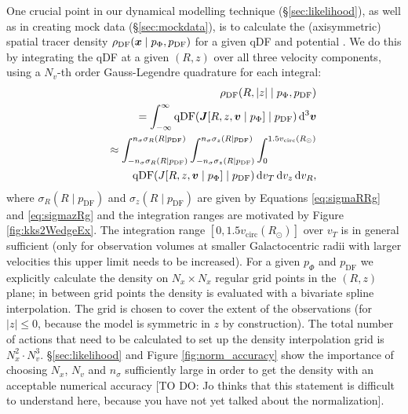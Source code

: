 One crucial point in our dynamical modelling technique (\S\ref{sec:likelihood}), as well as in creating mock data (\S\ref{sec:mockdata}), is to calculate the (axisymmetric) spatial tracer density $\rho_\text{DF}(\boldsymbol{x} \mid p_{\Phi},p_\text{DF})$ for a given qDF and potential . We do this by integrating the qDF at a given $(R,z)$ over all three velocity components, using a $N_v$-th order Gauss-Legendre quadrature for each integral:
\begin{eqnarray}
&&\rho_\text{DF}(R,|z| \mid p_{\Phi},p_\text{DF}) \nonumber\\
&&= \int_{-\infty}^{\infty} \text{qDF}(\boldsymbol{J}[R,z,\boldsymbol{v} \mid p_{\Phi}] \mid p_\text{DF}) \mathop{}\!\mathrm{d^3}\boldsymbol{v}  \label{eq:tracerdensity_general}\\
&&\approx \int_{-n_\sigma \sigma_R(R \mid p_\text{DF})}^{n_\sigma \sigma_R(R \mid p_\text{DF})} \int_{-n_\sigma\sigma_z(R \mid p_\text{DF})}^{n_\sigma \sigma_z(R \mid p_\text{DF})} \int_{0}^{1.5 v_\text{circ}(R_\odot)}  \nonumber\\
& & \hspace{1cm} \text{qDF}(J[R,z,\boldsymbol{v} \mid p_{\Phi}] \mid p_\text{DF}) \mathop{}\!\mathrm{d} v_T \mathop{}\!\mathrm{d} v_z \mathop{}\!\mathrm{d} v_R, \label{eq:tracerdensity}
\end{eqnarray}
where $\sigma_R(R \mid p_\text{DF})$ and $\sigma_z(R \mid p_\text{DF})$ are given by Equations \ref{eq:sigmaRRg} and \ref{eq:sigmazRg} and the integration ranges are motivated by Figure \ref{fig:kks2WedgeEx}. The integration range $[0,1.5 v_\text{circ}(R_\odot)]$ over $v_T$ is in general sufficient (only for observation volumes at smaller Galactocentric radii with larger velocities this upper limit needs to be increased). For a given $p_\Phi$ and $p_\text{DF}$ we explicitly calculate the density on $N_x \times N_x$ regular grid points in the $(R,z)$ plane; in between grid points the density is evaluated with a bivariate spline interpolation. The grid is chosen to cover the extent of the observations (for $|z|\leq0$, because the model is symmetric in $z$ by construction). The total number of actions that need to be calculated to set up the density interpolation grid is $N_x^2 \cdot N_v^3$. \S\ref{sec:likelihood} and Figure \ref{fig:norm_accuracy} show the importance of choosing $N_x$, $N_v$ and $n_\sigma$ sufficiently large in order to get the density with an acceptable numerical accuracy [TO DO: Jo thinks that this statement is difficult to understand here, because you have not yet talked about the normalization]. 





